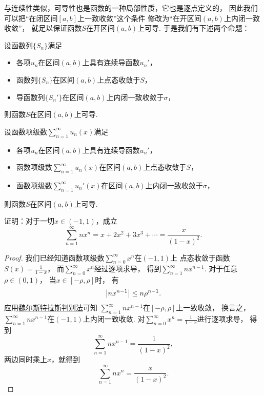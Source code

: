 与连续性类似，可导性也是函数的一种局部性质，它也是逐点定义的，
因此我们可以把“在闭区间\([a,b]\)上一致收敛”这个条件
修改为“在开区间\((a,b)\)上内闭一致收敛”，
就足以保证函数\(S\)在开区间\((a,b)\)上可导.
于是我们有下述两个命题：
\begin{proposition}
设函数列\(\{S_n\}\)满足\begin{itemize}
	\item 各项\(u_n\)在区间\((a,b)\)上具有连续导函数\(u_n'\)，
	\item 函数列\(\{S_n\}\)在区间\((a,b)\)上点态收敛于\(S\)，
	\item 导函数列\(\{S_n'\}\)在区间\((a,b)\)上内闭一致收敛于\(\sigma\)，
\end{itemize}
则函数\(S\)在区间\((a,b)\)上可导.
\end{proposition}
\begin{proposition}
设函数项级数\(\sum_{n=1}^\infty u_n(x)\)满足\begin{itemize}
	\item 各项\(u_n\)在区间\((a,b)\)上具有连续导函数\(u_n'\)，
	\item 函数项级数\(\sum_{n=1}^\infty u_n(x)\)在区间\((a,b)\)上点态收敛于\(S\)，
	\item 函数项级数\(\sum_{n=1}^\infty u_n'(x)\)在区间\((a,b)\)上内闭一致收敛于\(\sigma\)，
\end{itemize}
则函数\(S\)在区间\((a,b)\)上可导.
\end{proposition}

\begin{example}
证明：对于一切\(x\in(-1,1)\)，成立\[
	\sum_{n=1}^\infty n x^n
	= x + 2x^2 + 3x^3 + \dotsb
	= \frac{x}{(1-x)^2}.
\]
\begin{proof}
我们已经知道函数项级数\(\sum_{n=0}^\infty x^n\)在\((-1,1)\)上
点态收敛于函数\(S(x) = \frac1{1-x}\)，
而\(\sum_{n=0}^\infty x^n\)经过逐项求导，
得到\(\sum_{n=1}^\infty n x^{n-1}\).
对于任意\(\rho\in(0,1)\)，
当\(x\in[-\rho,\rho]\)时，
有\[
	\abs{n x^{n-1}} \leq n \rho^{n-1}.
\]
应用\hyperref[theorem:无穷级数.魏尔斯特拉斯判别法]{魏尔斯特拉斯判别法}可知
\(\sum_{n=1}^\infty n x^{n-1}\)在\([-\rho,\rho]\)上一致收敛，
换言之，\(\sum_{n=1}^\infty n x^{n-1}\)在\((-1,1)\)上内闭一致收敛.
对\(\sum_{n=0}^\infty x^n = \frac1{1-x}\)进行逐项求导，
得到\[
	\sum_{n=1}^\infty n x^{n-1}
	= \frac1{(1-x)^2},
\]
两边同时乘上\(x\)，就得到\[
	\sum_{n=1}^\infty n x^n
	= \frac{x}{(1-x)^2}.
\]
\end{proof}
\end{example}
